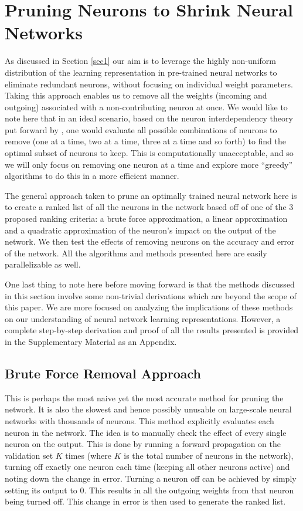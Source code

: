 \section{Pruning Neurons to Shrink Neural Networks}\label{sec2}
As discussed in Section \ref{sec1} our aim is to leverage the highly non-uniform distribution of the learning representation in pre-trained neural networks to eliminate redundant neurons, without focusing on individual weight parameters. Taking this approach enables us to remove all the weights (incoming and outgoing) associated with a non-contributing neuron at once. We would like to note here that in an ideal scenario, based on the neuron interdependency theory put forward by \cite{mozer1989skeletonization}, one would evaluate all possible combinations of neurons to remove (one at a time, two at a time, three at a time and so forth) to find the optimal subset of neurons to keep. This is computationally unacceptable, and so we will only focus on removing one neuron at a time and explore more ``greedy'' algorithms to do this in a more efficient manner.

The general approach taken to prune an optimally trained neural network here is to create a ranked list of all the neurons in the network based off of one of the 3 proposed ranking criteria: a brute force approximation, a linear approximation and a quadratic approximation of the neuron's impact on the output of the network. We then test the effects of removing neurons on the accuracy and error of the network. All the algorithms and methods presented here are easily parallelizable as well.

One last thing to note here before moving forward is that the methods discussed in this section involve some non-trivial derivations which are beyond the scope of this paper. We are more focused on analyzing the implications of these methods on our understanding of neural network learning representations. However, a complete step-by-step derivation and proof of all the results presented is provided in the Supplementary Material as an Appendix.

\subsection{Brute Force Removal Approach}
This is perhaps the most naive yet the most accurate method for pruning the network. It is also the slowest and hence possibly unusable on large-scale neural networks with thousands of neurons. This method explicitly evaluates each neuron in the network. The idea is to manually check the effect of every single neuron on the output. This is done by running a forward propagation on the validation set $K$ times (where $K$ is the total number of neurons in the network), turning off exactly one neuron each time (keeping all other neurons active) and noting down the change in error. Turning a neuron off can be achieved by simply setting its output to 0. This results in all the outgoing weights from that neuron being turned off. This change in error is then used to generate the ranked list. 




